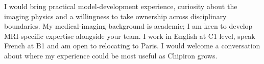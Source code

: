 {    I would bring practical model-development experience, curiosity about the imaging physics and a willingness to take ownership across disciplinary boundaries. My medical-imaging background is academic; I am keen to develop MRI-specific expertise alongside your team. I work in English at C1 level, speak French at B1 and am open to relocating to Paris. I would welcome a conversation about where my experience could be most useful as Chipiron grows.

}
